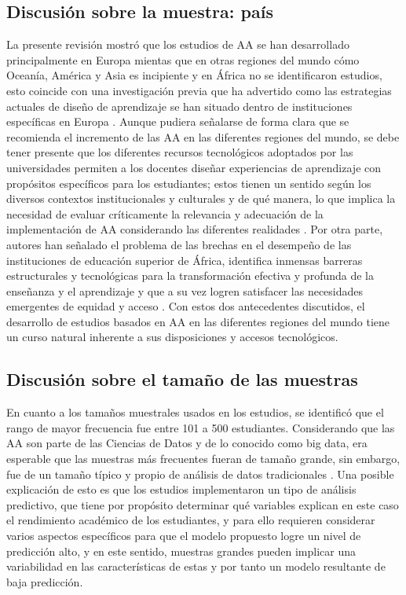 \documentclass[spanish]{textolivre}
\begin{document}
\subsection*{Discusión sobre la muestra: país}
La presente revisión mostró que los estudios de AA se han desarrollado principalmente en Europa mientas que en otras regiones del mundo cómo Oceanía, América y Asia es incipiente y en África no se identificaron estudios, esto coincide con una investigación previa que ha advertido como las estrategias actuales de diseño de aprendizaje se han situado dentro de instituciones específicas en Europa \cite{mittelmeier2018}. Aunque pudiera señalarse de forma clara que se recomienda el incremento de las AA en las diferentes regiones del mundo, se debe tener presente que los diferentes recursos tecnológicos adoptados por las universidades permiten a los docentes diseñar experiencias de aprendizaje con propósitos específicos para los estudiantes; estos tienen un sentido según los diversos contextos institucionales y culturales y de qué manera, lo que implica la necesidad de evaluar críticamente la relevancia y adecuación de la implementación de AA considerando las diferentes realidades \cite{zabolotniaia2020}. Por otra parte, autores han señalado el problema de las brechas en el desempeño de las instituciones de educación superior de África, identifica inmensas barreras estructurales y tecnológicas para la transformación efectiva y profunda de la enseñanza y el aprendizaje y que a su vez logren satisfacer las necesidades emergentes de equidad y acceso \cite{lusigi2019}. Con estos dos antecedentes discutidos, el desarrollo de estudios basados en AA en las diferentes regiones del mundo tiene un curso natural inherente a sus disposiciones y accesos tecnológicos.

\subsection*{Discusión sobre el tamaño de las muestras}
En cuanto a los tamaños muestrales usados en los estudios, se identificó que el rango de mayor frecuencia fue entre 101 a 500 estudiantes. Considerando que las AA son parte de las Ciencias de Datos y de lo conocido como big data, era esperable que las muestras más frecuentes fueran de tamaño grande, sin embargo, fue de un tamaño típico y propio de análisis de datos tradicionales \cite{wibawa2021}. Una posible explicación de esto es que los estudios implementaron un tipo de análisis predictivo, que tiene por propósito determinar qué variables explican en este caso el rendimiento académico de los estudiantes, y para ello requieren considerar varios aspectos específicos para que el modelo propuesto logre un nivel de predicción alto, y en este sentido, muestras grandes pueden implicar una variabilidad en las características de estas y por tanto un modelo resultante de baja predicción.
\end{document}
